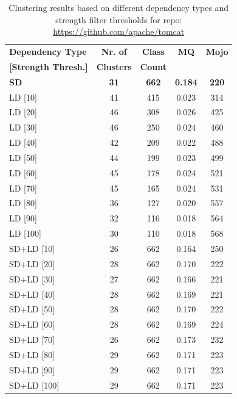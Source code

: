 \documentclass{ieeeaccess}
\begin{document}
\begin{table}[h]
\caption{Clustering results based on different dependency types and strength filter thresholds for repo: \href{https://github.com/apache/tomcat}{https://github.com/apache/tomcat}}
\label{tab:clustering_results_tomcat}
\centering
\setlength{\tabcolsep}{10pt}
\begin{tabular}{|l|c|c|c|c|}
\hline
\textbf{Dependency Type} & \textbf{Nr. of} & \textbf{Class} & \textbf{MQ} & \textbf{Mojo} \\
\textbf{[Strength Thresh.]} & \textbf{Clusters} & \textbf{Count} &  &  \\
\hline
\textbf{SD} & \textbf{31} & \textbf{662} & \textbf{0.184} & \textbf{220} \\
LD [10] & 41 & 415 & 0.023 & 314 \\
LD [20] & 46 & 308 & 0.026 & 425 \\
LD [30] & 46 & 250 & 0.024 & 460 \\
LD [40] & 42 & 209 & 0.022 & 488 \\
LD [50] & 44 & 199 & 0.023 & 499 \\
LD [60] & 45 & 178 & 0.024 & 521 \\
LD [70] & 45 & 165 & 0.024 & 531 \\
LD [80] & 36 & 127 & 0.020 & 557 \\
LD [90] & 32 & 116 & 0.018 & 564 \\
LD [100] & 30 & 110 & 0.018 & 568 \\
\hline
SD+LD [10] & 26 & 662 & 0.164 & 250 \\
SD+LD [20] & 28 & 662 & 0.170 & 222 \\
SD+LD [30] & 27 & 662 & 0.166 & 221 \\
SD+LD [40] & 28 & 662 & 0.169 & 221 \\
SD+LD [50] & 28 & 662 & 0.170 & 222 \\
SD+LD [60] & 28 & 662 & 0.169 & 224 \\
SD+LD [70] & 26 & 662 & 0.173 & 232 \\
SD+LD [80] & 29 & 662 & 0.171 & 223 \\
SD+LD [90] & 29 & 662 & 0.171 & 223 \\
SD+LD [100] & 29 & 662 & 0.171 & 223 \\
\hline
\end{tabular}
\end{table}
\end{document}
